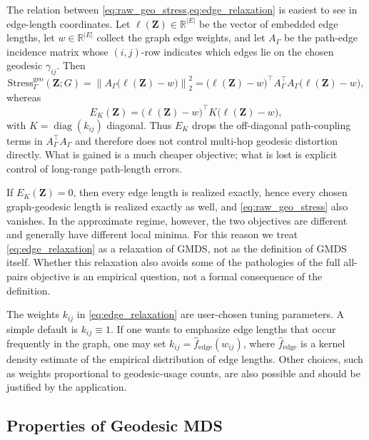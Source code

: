 \documentclass[twoside,11pt]{article}
\newcommand{\R}{\mathbb{R}}
\newcommand{\bZ}{\mathbf{Z}}
\newcommand{\norm}[1]{\left\|#1\right\|}
\newcommand{\Stress}{\mathrm{Stress}}
\newcommand{\diag}{\operatorname{diag}}
\begin{document}
The relation between \cref{eq:raw_geo_stress,eq:edge_relaxation} is easiest to
see in edge-length coordinates.  Let $\ell(\bZ) \in \R^{|E|}$ be the vector of
embedded edge lengths, let $w \in \R^{|E|}$ collect the graph edge weights, and
let $A_{\Gamma}$ be the path-edge incidence matrix whose $(i,j)$-row indicates
which edges lie on the chosen geodesic $\gamma_{ij}$.  Then
\begin{equation}
  \Stress^{\mathrm{geo}}_{\Gamma}(\bZ; G)
  = \norm{A_{\Gamma}\bigl(\ell(\bZ) - w\bigr)}_2^2
  = \bigl(\ell(\bZ)-w\bigr)^\top
    A_{\Gamma}^\top A_{\Gamma}
    \bigl(\ell(\bZ)-w\bigr),
  \label{eq:path_incidence_stress}
\end{equation}
whereas
\begin{equation}
  E_K(\bZ)
  = \bigl(\ell(\bZ)-w\bigr)^\top K \bigl(\ell(\bZ)-w\bigr),
  \label{eq:edge_relaxation_matrix}
\end{equation}
with $K = \diag(k_{ij})$ diagonal.  Thus $E_K$ drops the off-diagonal
path-coupling terms in $A_{\Gamma}^\top A_{\Gamma}$ and therefore does not
control multi-hop geodesic distortion directly.  What is gained is a much
cheaper objective; what is lost is explicit control of long-range path-length
errors.

If $E_K(\bZ) = 0$, then every edge length is realized exactly, hence every
chosen graph-geodesic length is realized exactly as well, and
\cref{eq:raw_geo_stress} also vanishes.  In the approximate regime, however,
the two objectives are different and generally have different local minima.
For this reason we treat \cref{eq:edge_relaxation} as a relaxation of GMDS,
not as the definition of GMDS itself.  Whether this relaxation also avoids
some of the pathologies of the full all-pairs objective is an empirical
question, not a formal consequence of the definition.

The weights $k_{ij}$ in \cref{eq:edge_relaxation} are user-chosen tuning
parameters.  A simple default is $k_{ij} \equiv 1$.  If one wants to emphasize
edge lengths that occur frequently in the graph, one may set
$k_{ij} = \hat f_{\mathrm{edge}}(w_{ij})$, where
$\hat f_{\mathrm{edge}}$ is a kernel density estimate of the empirical
distribution of edge lengths.  Other choices, such as weights proportional to
geodesic-usage counts, are also possible and should be justified by the
application.

\subsection{Properties of Geodesic MDS}
\label{sec:properties}
\end{document}
